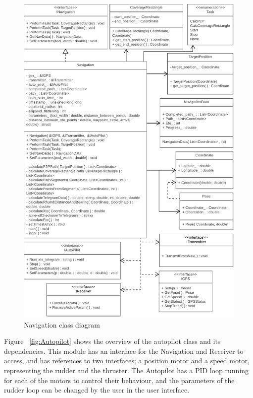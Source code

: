\begin{figure}[H]
\centering
\includegraphics[max width=1\linewidth]{Navigation_class_diagram}
\caption{Navigation class diagram}
\label{fig:Navigation}
\end{figure}

Figure ~\ref{fig:Autopilot} shows the overview of the autopilot class and its dependencies. This module has an interface for the Navigation and Receiver to access, and has references to two interfaces; a position motor and a speed motor, representing the rudder and the thruster. The Autopilot has a PID loop running for each of the motors to control their behaviour, and the parameters of the rudder loop can be changed by the user in the user interface.

